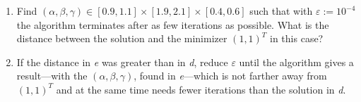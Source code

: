 \documentclass[11pt,oneside]{extarticle}
\begin{document}
\begin{enumerate}
    \item Find $(\alpha, \beta, \gamma ) \in \left[ 0.9,1.1\right] \times
        \left[1.9,2.1\right] \times \left[0.4,0.6\right]$ such that with
        $\varepsilon := 10^{-4}$ the algorithm terminates after as few iterations
        as possible. What is the distance between the solution and the minimizer
        $(1,1)^T$ in this case?

    \item If the distance in \emph{e} was greater than in \emph{d}, reduce
        $\varepsilon$ until the algorithm gives a result---with the $(\alpha,\beta,\gamma)$,
        found in \emph{e}---which is not farther away from $(1,1)^T$ and at the same
        time needs fewer iterations than the solution in \emph{d}.

\end{enumerate}
\end{document}
